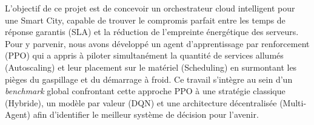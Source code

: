 L'objectif de ce projet est de concevoir un orchestrateur cloud intelligent pour une Smart City, capable de trouver le compromis parfait entre les temps de réponse garantis (SLA) et la réduction de l'empreinte énergétique des serveurs.
Pour y parvenir, nous avons développé un agent d'apprentissage par renforcement (PPO) qui a appris à piloter simultanément la quantité de services allumés (Autoscaling) et leur placement sur le matériel (Scheduling) en surmontant les pièges du gaspillage et du démarrage à froid.
Ce travail s'intègre au sein d'un \textit{benchmark} global confrontant cette approche PPO à une stratégie classique (Hybride), un modèle par valeur (DQN) et une architecture décentralisée (Multi-Agent) afin d'identifier le meilleur système de décision pour l'avenir.